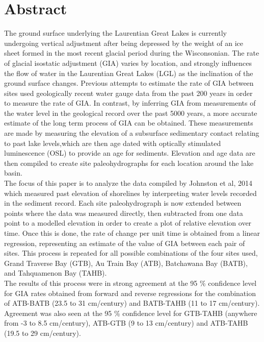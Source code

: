 


\newcommand{\result}[1]{%
    \dtlgetrowforvalue{result}{\dtlcolumnindex{result}{id}}{#1}%
}


\section{Abstract}

The ground surface underlying the Laurentian Great Lakes is currently undergoing vertical adjustment
 after being depressed by the weight of an ice sheet formed in the most recent glacial period during the Wisconsonian.
 The rate of glacial isostatic adjustment (GIA) varies by location, and strongly influences the flow of water
 in the Laurentian Great Lakes (LGL) as the inclination of the ground surface changes. Previous attempts to 
 estimate the rate of GIA between sites used geologically recent water gauge data from the
 past 200 years in order to measure the rate of GIA. In contrast, by
 inferring GIA from measurements of the water level in the geological record over the past 5000 years,
 a more accurate estimate of the long term process of GIA can be obtained. These measurements are
 made by measuring the elevation of a subsurface sedimentary contact relating to
 past lake levels,which are then age dated with optically stimulated luminescence
 (OSL) to provide an age for sediments. Elevation and age data are then compiled
 to create site paleohydrographs for each location around the lake basin.\\
 
 The focus of this paper is to analyze the data compiled by Johnston et al, 2014
 which measured past elevation of shorelines by interpreting water levels recorded
 in the sediment record. Each site paleohydrograph
 is now extended between points where the data was measured directly, then subtracted
 from one data point to a modelled elevation in order to create a
 plot of relative elevation over time. Once this is done, the rate of change per unit
 time is obtained from a linear regression, representing an estimate of the value
 of GIA between each pair of sites. This process is repeated for
 all possible combinations of the four sites used, 
 Grand Traverse Bay (GTB), Au Train Bay (ATB), Batchawana Bay (BATB), and Tahquamenon Bay (TAHB).\\
 
 
 
 The results of this process were in strong agreement at the 95 \% confidence level for GIA rates obtained from
 forward and reverse regressions for the combination of ATB-BATB (23.5 to 31 cm/century) and
 BATB-TAHB (11 to 17 cm/century). Agreement was also seen at the 95 \% confidence level for GTB-TAHB (anywhere from -3 to 8.5 cm/century),
 ATB-GTB (9 to 13 cm/century) and ATB-TAHB (19.5 to 29 cm/century).
